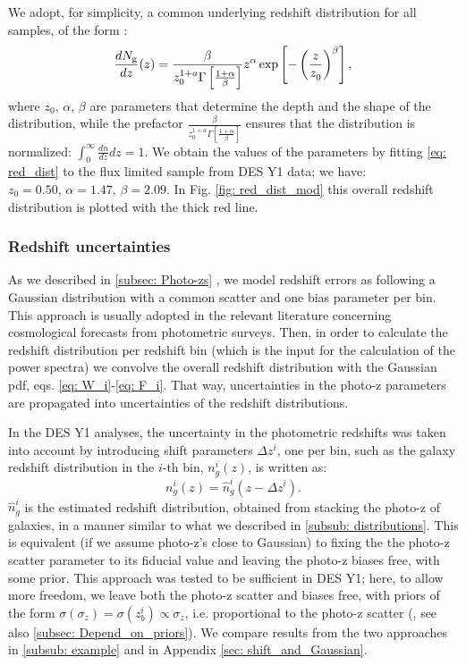 \documentclass[a4paper,fleqn,usenatbib]{mnras}
\begin{document}
We adopt, for simplicity, a common underlying  redshift distribution for all samples, of the form \citep{Efstathiou1991, Smail1994}:
\begin{equation}
\label{eq: red_dist}
\frac{dN_{\mbox{\scriptsize{g}}}}{dz}(z) = \frac{\beta}{z_0^{1+a}\Gamma\left[ \frac{1+ \alpha}{\beta}\right]}z^\alpha \exp \left[-\left( \frac{z	}{z_{0}^{}}\right)^\beta \right],
\end{equation}
where $z_0, \,\alpha,\, \beta$ are parameters that determine the depth and the shape of the distribution, while the prefactor $ \frac{\beta}{z_0^{1+a}\Gamma\left[ \frac{1+ \alpha}{\beta}\right]}$ ensures that the distribution is normalized: $\int_0^{\infty} \frac{dn}{dz}dz = 1$. We obtain the values of the parameters by fitting \eqref{eq: red_dist} to the flux limited sample from DES Y1 data; we have: $z_0 = 0.50, \, \alpha=1.47, \, \beta = 2.09$. In Fig. \ref{fig: red_dist_mod}  this overall redshift distribution is plotted with the thick red line.

\subsubsection{Redshift uncertainties}

As we described in \ref{subsec: Photo-zs} , we model redshift errors as  following a Gaussian distribution with a common scatter and one bias parameter per bin. This approach is usually adopted in the relevant literature concerning cosmological forecasts from photometric surveys. Then, in order to calculate the redshift distribution per redshift bin (which is the input for the calculation of the power spectra) we convolve the overall redshift distribution with the Gaussian pdf, eqs. \eqref{eq: W_i}-\eqref{eq: F_i}. That way, uncertainties in the photo-z parameters are propagated into uncertainties of the redshift distributions.

In the DES Y1 analyses, the uncertainty in the photometric redshifts was taken into account by introducing shift parameters $\Delta z^i$, one per bin, such as the galaxy redshift distribution in the $i$-th bin,   $n_g^i(z)$, is written as: 
\begin{equation}
n_g^i(z) = \hat{n}^i_g(z - \Delta z^i)
\label{eq: shifts}.
\end{equation}
$\hat{n}^i_g$ is the estimated redshift distribution, obtained from stacking the photo-z of  galaxies, in a manner similar to what we described in \ref{subsub: distributions}. This is equivalent (if we assume photo-z's close to Gaussian) to fixing the the photo-z scatter parameter to its fiducial value and leaving the photo-z biases free, with some prior. 
This approach was tested to be sufficient in DES Y1; here, to allow more freedom, we leave both the photo-z scatter and biases free, with priors of the form $\sigma(\sigma_z) = \sigma(z_b^i) \propto \sigma_z$, i.e. proportional to the photo-z scatter (, see also \ref{subsec: Depend_on_priors}). We compare results from the two approaches in \ref{subsub: example} and in Appendix \ref{sec: shift_and_Gaussian}.
\end{document}
